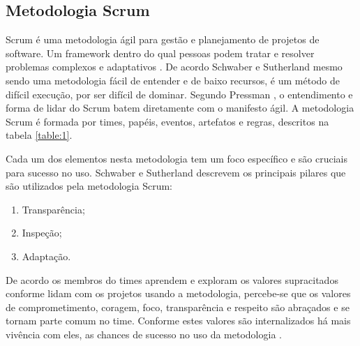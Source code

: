 \subsection{Metodologia Scrum}

Scrum é uma metodologia ágil para gestão e planejamento de projetos de software. Um framework dentro do qual pessoas podem tratar e resolver problemas complexos e adaptativos \cite{desenvolvimentoagil}. De acordo Schwaber e Sutherland \cite{Scrum} mesmo sendo uma metodologia fácil de entender e de baixo recursos, é um método de difícil execução, por ser difícil de dominar. Segundo Pressman \cite{pressman}, o entendimento e forma de lidar do Scrum batem diretamente com o manifesto ágil. A metodologia Scrum é formada por times, papéis, eventos, artefatos e regras, descritos na tabela \ref{table:1}.

Cada um dos elementos nesta metodologia tem um foco específico e são cruciais para sucesso no uso. Schwaber e Sutherland \cite{Scrum} descrevem os principais pilares que são utilizados pela metodologia Scrum:

\begin{enumerate}
    \item Transparência;
    \item Inspeção;
    \item Adaptação.
\end{enumerate}

De acordo os membros do times aprendem e exploram os valores supracitados conforme lidam com os projetos usando a metodologia, percebe-se que os valores de comprometimento, coragem, foco, transparência e respeito são abraçados e se tornam parte comum no time. Conforme estes valores são internalizados há mais vivência com eles, as chances de sucesso no uso da metodologia \cite{Scrum}.

